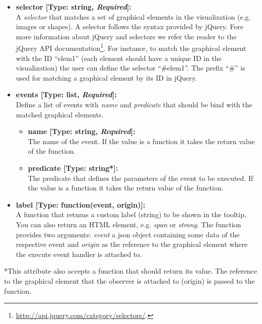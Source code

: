 \begin{itemize}

\item[] \textbf{selector [Type: string, \textit{Required}]:}\\ A \textit{selector} that matches a set of graphical elements in the visualization (e.g. images or shapes). 
A selector follows the syntax provided by jQuery.
Fore more information about jQuery and selectors we refer the reader to the jQuery API documentation\footnote{\url{http://api.jquery.com/category/selectors/}.}. 
For instance, to match the graphical element with the ID ``elem1'' (each element should have a unique ID in the visualization) the user can define the selector ``\#elem1''.
The prefix ``\#'' is used for matching a graphical element by its ID in jQuery.

\item[] \textbf{events [Type: list, \textit{Required}]:}\\
Define a list of events with \textit{name} and \textit{predicate} that should be bind with the matched graphical elements.

\begin{itemize}

\item[] \textbf{name [Type: string, \textit{Required}]:}\\
The name of the event. 
If the value is a function it takes the return value of the function.

\item[] \textbf{predicate [Type: string*]:}\\
The predicate that defines the parameters of the event to be executed.
If the value is a function it takes the return value of the function.

\end{itemize}

\item[] \textbf{label [Type: function(event, origin)]:}\\
A function that returns a custom label (string) to be shown in the tooltip.
You can also return an HTML element, e.g. \textit{span} or \textit{strong}.
 The function provides two arguments: \textit{event} a json object containing some data of the respective event and \textit{origin} as the reference to the graphical element where the execute event handler is attached to.
	
\end{itemize}

*This attribute also accepts a function that should return its value.
The reference to the graphical element that the observer is attached to (origin) is passed to the function.

